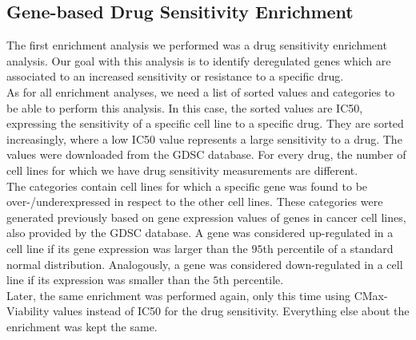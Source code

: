 \subsection{Gene-based Drug Sensitivity Enrichment}\label{subsec:sd_enrichment_1}
The first enrichment analysis we performed was a drug sensitivity enrichment analysis. Our goal with this analysis is to identify deregulated genes which are associated to an increased sensitivity or resistance to a specific drug.\\
As for all enrichment analyses, we need a list of sorted values and categories to be able to perform this analysis. In this case, the sorted values are IC50, expressing the sensitivity of a specific cell line to a specific drug. They are sorted increasingly, where a low IC50 value represents a large sensitivity to a drug. The values were downloaded from the GDSC database. For every drug, the number of cell lines for which we have drug sensitivity measurements are different.\\
The categories contain cell lines for which a specific gene was found to be over-/underexpressed in respect to the other cell lines. These categories were generated previously based on gene expression values of genes in cancer cell lines, also provided by the GDSC database. A gene was considered up-regulated in a cell line if its gene expression was larger than the $95$th percentile of a standard normal distribution. Analogously, a gene was considered down-regulated in a cell line if its expression was smaller than the $5$th percentile.\\
Later, the same enrichment was performed again, only this time using CMax-Viability values instead of IC50 for the drug sensitivity. Everything else about the enrichment was kept the same.

